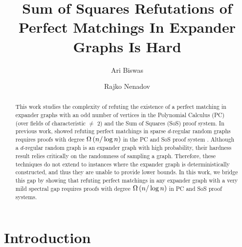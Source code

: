 \documentclass[11pt]{article}
\title{Sum of Squares Refutations of Perfect Matchings In Expander Graphs Is Hard}
\author[1]{Ari Biswas}
\author[2]{Rajko Nenadov}
\affil[1]{\small University Of Warwick, United Kingdom}
\affil[2]{\small University Of Auckland, New Zealand}
\date{}
\begin{document}
\maketitle
\begin{abstract}
This work studies the complexity of refuting the existence of a perfect matching in expander graphs with an odd number of vertices in the Polynomial Calculus (PC) (over fields of characteristic $\neq$ 2) and the Sum of Squares (SoS) proof system.
In previous work, \citet{Austrin_2022} showed  refuting perfect matchings in sparse $d$-regular random graphs requires proofs with degree $\Omega\left(n/\log n\right)$ in the PC and SoS proof system .
Although a $d$-regular random graph is an expander graph with high probability, their hardness result relies critically on the randomness of sampling a graph. 
Therefore, these techniques do not extend to instances where the expander graph is deterministically constructed, and thus they are unable to provide  lower bounds.
In this work, we bridge this gap by showing that refuting perfect matchings in any expander graph with a very mild spectral gap requires proofs with degree $\Omega\left(n/\log n\right)$ in PC and SoS proof systems.

\end{abstract}

\section{Introduction}
\end{document}
